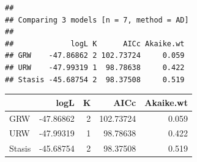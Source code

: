 \documentclass[]{article}
\begin{document}
\begin{verbatim}
## 
## Comparing 3 models [n = 7, method = AD]
## 
##             logL K      AICc Akaike.wt
## GRW    -47.86862 2 102.73724     0.059
## URW    -47.99319 1  98.78638     0.422
## Stasis -45.68754 2  98.37508     0.519
\end{verbatim}

\begin{longtable}[]{@{}lrrrr@{}}
\toprule
& logL & K & AICc & Akaike.wt\tabularnewline
\midrule
\endhead
GRW & -47.86862 & 2 & 102.73724 & 0.059\tabularnewline
URW & -47.99319 & 1 & 98.78638 & 0.422\tabularnewline
Stasis & -45.68754 & 2 & 98.37508 & 0.519\tabularnewline
\bottomrule
\end{longtable}
\end{document}
